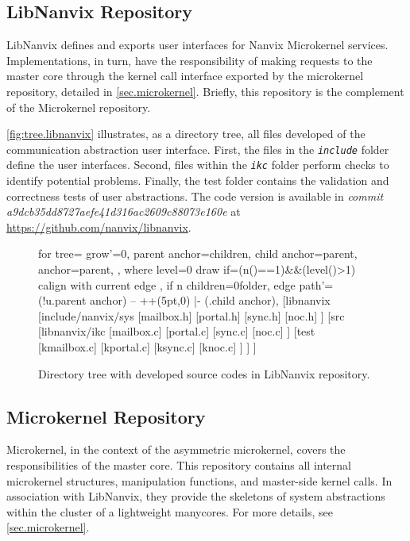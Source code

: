 	\subsection{LibNanvix Repository}

		LibNanvix defines and exports user interfaces for Nanvix Microkernel
		services. Implementations, in turn, have the responsibility of making
		requests to the master core through the kernel call interface exported
		by the microkernel repository, detailed in \autoref{sec.microkernel}.
		Briefly, this repository is the complement of the Microkernel repository.

		\autoref{fig:tree.libnanvix} illustrates, as a directory tree,
		all files developed of the communication abstraction user
		interface. First, the files in the \textit{\texttt{include}} folder
		define the user interfaces. Second, files within the
		\textit{\texttt{ikc}} folder perform checks to identify potential
		problems. Finally, the test folder contains the validation
		and correctness tests of user abstractions. The code version
		is available in \textit{commit a9dcb35dd8727aefe41d316ac2609c88073e160e}
		at \url{https://github.com/nanvix/libnanvix}.

		\begin{figure}[!ht]
			\centering%
			\caption{Directory tree with developed source codes in LibNanvix repository.}%
			\label{fig:tree.libnanvix}%
			\begin{forest}
			for tree={
				grow'=0,
				parent anchor=children,
				child anchor=parent,
				anchor=parent,
			},
			where level=0{
				draw
			}{
				if={(n()==1)&&(level()>1)}{
				calign with current edge
				}{},
				if n children=0{folder}{},
				edge path'={(!u.parent anchor) -- ++(5pt,0) |- (.child anchor)},
			}
			[libnanvix
				[include/nanvix/sys
					[mailbox.h]
					[portal.h]
					[sync.h]
					[noc.h]
				]
				[src
					[libnanvix/ikc
						[mailbox.c]
						[portal.c]
						[sync.c]
						[noc.c]
					]
					[test
						[kmailbox.c]
						[kportal.c]
						[ksync.c]
						[knoc.c]
					]
				]
			]
			\end{forest}%
		\end{figure}

	\subsection{Microkernel Repository}

		Microkernel, in the context of the asymmetric microkernel, covers the
		responsibilities of the master core. This repository contains all
		internal microkernel structures, manipulation functions, and
		master-side kernel calls. In association with LibNanvix, they provide
		the skeletons of system abstractions within the cluster of a lightweight
		manycores. For more details, see \autoref{sec.microkernel}.

